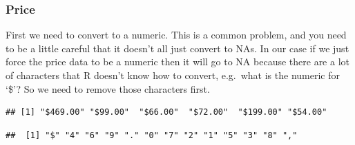 \documentclass[
]{book}
\newenvironment{Shaded}{\begin{snugshade}}{\end{snugshade}}
\newcommand{\CommentTok}[1]{\textcolor[rgb]{0.56,0.35,0.01}{\textit{#1}}}
\newcommand{\KeywordTok}[1]{\textcolor[rgb]{0.13,0.29,0.53}{\textbf{#1}}}
\newcommand{\NormalTok}[1]{#1}
\newcommand{\OperatorTok}[1]{\textcolor[rgb]{0.81,0.36,0.00}{\textbf{#1}}}
\newcommand{\StringTok}[1]{\textcolor[rgb]{0.31,0.60,0.02}{#1}}
\begin{document}
\hypertarget{price}{%
\subsubsection{Price}\label{price}}

First we need to convert to a numeric. This is a common problem, and you need to be a little careful that it doesn't all just convert to NAs. In our case if we just force the price data to be a numeric then it will go to NA because there are a lot of characters that R doesn't know how to convert, e.g.~what is the numeric for `\$'? So we need to remove those characters first.

\begin{Shaded}
\end{Shaded}

\begin{verbatim}
## [1] "$469.00" "$99.00"  "$66.00"  "$72.00"  "$199.00" "$54.00"
\end{verbatim}

\begin{Shaded}
\end{Shaded}

\begin{verbatim}
##  [1] "$" "4" "6" "9" "." "0" "7" "2" "1" "5" "3" "8" ","
\end{verbatim}

\begin{Shaded}
\end{Shaded}
\end{document}
